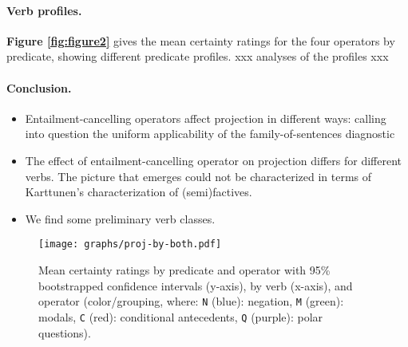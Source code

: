	

\vspace{-\baselineskip}
\paragraph{Verb profiles.} %
	\textbf{Figure \ref{fig:figure2}} gives the mean certainty ratings for the four operators by predicate, showing different predicate profiles. xxx analyses of the profiles xxx

\vspace{-\baselineskip}
\paragraph{Conclusion.} %
	\begin{itemize}
		\item Entailment-cancelling operators affect projection in different ways: calling into question the uniform applicability of the family-of-sentences diagnostic
		\item The effect of entailment-cancelling operator on projection differs for different verbs. The picture that emerges could not be characterized in terms of Karttunen's characterization of (semi)factives.
		\item We find some preliminary verb classes.
	\end{itemize}

\pagebreak
\begin{figure}[t]
		\vspace{-.8\baselineskip}
		\centering
		\texttt{[image: graphs/proj-by-both.pdf]}\vspace{-1.2\baselineskip}
		\caption{\small Mean certainty ratings by predicate and operator with 95\% bootstrapped confidence intervals (y-axis), by verb (x-axis), and operator (color/grouping, where: \texttt{N} (blue): negation, \texttt{M} (green): modals, \texttt{C} (red): conditional antecedents, \texttt{Q} (purple): polar questions).}
		\label{fig:figure1}
	\end{figure}

